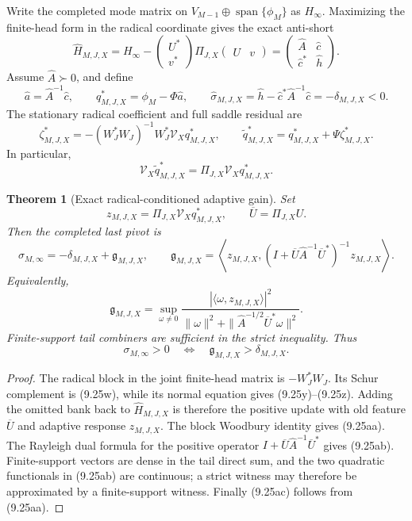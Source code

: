\documentclass[11pt]{amsart}
\newtheorem{theorem}{Theorem}[section]
\theoremstyle{definition}
\theoremstyle{remark}
\begin{document}
Write the completed mode matrix on
\(V_{M-1}\oplus\operatorname{span}\{\phi_M\}\) as \(H_\infty\).
Maximizing the finite-head form in the radical coordinate gives the exact
anti-short
\[
 \boxed{
 \widehat H_{M,J,X}=H_\infty-
 \begin{pmatrix}U^*\\v^*\end{pmatrix}
 \Pi_{J,X}\begin{pmatrix}U&v\end{pmatrix}
 =\begin{pmatrix}\widehat A&\widehat c\\
                  \widehat c^*&\widehat h\end{pmatrix}.}
\tag{9.25w}
\]
Assume \(\widehat A\succ0\), and define
\[
 \widehat a=\widehat A^{-1}\widehat c,\qquad
 q_{M,J,X}^*=\phi_M-\Phi\widehat a,\qquad
 \widehat\sigma_{M,J,X}
 =\widehat h-\widehat c^*\widehat A^{-1}\widehat c
 =-\delta_{M,J,X}<0.
\tag{9.25x}
\]
The stationary radical coefficient and full saddle residual are
\[
 \zeta_{M,J,X}^*=-(W_J^*W_J)^{-1}W_J^*\mathcal V_Xq_{M,J,X}^*,
 \qquad
 \widetilde q_{M,J,X}^*=q_{M,J,X}^*+\Psi\zeta_{M,J,X}^*.
\tag{9.25y}
\]
In particular,
\[
 \mathcal V_X\widetilde q_{M,J,X}^*
 =\Pi_{J,X}\mathcal V_Xq_{M,J,X}^*.
\tag{9.25z}
\]

\begin{theorem}[Exact radical-conditioned adaptive gain]
\label{thm:radical-conditioned-gain}
Set
\[
 z_{M,J,X}=\Pi_{J,X}\mathcal V_Xq_{M,J,X}^*,
 \qquad \overline U=\Pi_{J,X}U.
\]
Then the completed last pivot is
\[
 \boxed{
 \sigma_{M,\infty}=-\delta_{M,J,X}+\mathfrak g_{M,J,X},
 \qquad
 \mathfrak g_{M,J,X}
 =\left\langle z_{M,J,X},
 (I+\overline U\widehat A^{-1}\overline U^*)^{-1}
 z_{M,J,X}\right\rangle.}
\tag{9.25aa}
\]
Equivalently,
\[
 \boxed{
 \mathfrak g_{M,J,X}
 =\sup_{\omega\ne0}
 \frac{|\langle\omega,z_{M,J,X}\rangle|^2}
 {\|\omega\|^2+
  \|\widehat A^{-1/2}\overline U^*\omega\|^2}.}
\tag{9.25ab}
\]
Finite-support tail combiners are sufficient in the strict inequality.
Thus
\[
 \boxed{\sigma_{M,\infty}>0
 \quad\Longleftrightarrow\quad
 \mathfrak g_{M,J,X}>\delta_{M,J,X}.}
\tag{9.25ac}
\]
\end{theorem}

\begin{proof}
The radical block in the joint finite-head matrix is
\(-W_J^*W_J\).  Its Schur complement is (9.25w), while its normal
equation gives (9.25y)--(9.25z).  Adding the omitted bank back to
\(\widehat H_{M,J,X}\) is therefore the positive update with old feature
\(\overline U\) and adaptive response \(z_{M,J,X}\).  The block Woodbury
identity gives (9.25aa).  The Rayleigh dual formula for the positive
operator \(I+\overline U\widehat A^{-1}\overline U^*\) gives (9.25ab).
Finite-support vectors are dense in the tail direct sum, and the two
quadratic functionals in (9.25ab) are continuous; a strict witness may
therefore be approximated by a finite-support witness.  Finally
(9.25ac) follows from (9.25aa).
\end{proof}
\end{document}
